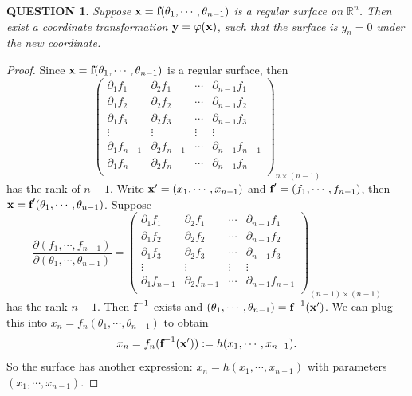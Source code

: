 \documentclass[12pt]{article}
\renewcommand{\(}{\left(}%
\renewcommand{\)}{\right)}%
\renewcommand{\[}{\left[}%
\renewcommand{\]}{\right]}%
\renewcommand{\r}{\mathbb{R}}
\newcommand{\pa}{\partial}
\newtheorem{question}{QUESTION}[section]}
\newtheorem{proof}{Proof.}}
\begin{document}
  \begin{question}
   Suppose $\text{\rmfamily \bfseries x}=\text{\rmfamily \bfseries f}(\theta_1,\cdots,\theta_{n-1} )$ is a regular surface on $\r^n$. Then  exist a coordinate transformation $\text{\rmfamily \bfseries y}=\varphi(\text{\rmfamily \bfseries x})$, such that the surface is $y_n=0$ under the new coordinate.
  \end{question}
  \begin{proof}
   Since $\text{\rmfamily \bfseries x}=\text{\rmfamily \bfseries f}(\theta_1,\cdots,\theta_{n-1} )$ is a regular surface, then
   \begin{equation*}
    \begin{pmatrix}
     \partial_1 f_1 & \partial_2 f_1 & \cdots & \partial_{n-1} f_1\\
     \partial_1 f_2 & \partial_2 f_2 & \cdots & \partial_{n-1} f_2\\
     \partial_1 f_3 & \partial_2 f_3 & \cdots & \partial_{n-1} f_3\\
     \vdots & \vdots & \vdots & \vdots\\
     \partial_1 f_{n-1} & \partial_2 f_{n-1} & \cdots & \partial_{n-1} f_{n-1}\\
     \partial_1 f_n & \partial_2 f_n & \cdots & \partial_{n-1} f_n\\
    \end{pmatrix}_{n\times (n-1)}
   \end{equation*}
   has the rank of $n-1$. Write $\text{\rmfamily \bfseries x}'=(x_1,\cdots,x_{n-1} )$ and $\text{\rmfamily \bfseries f}'=(f_1,\cdots,f_{n-1} )$, then $\text{\rmfamily \bfseries x}=\text{\rmfamily \bfseries f}'(\theta_1,\cdots,\theta_{n-1})$.
   Suppose
   \begin{equation*}
    \frac{\pa(f_1,\cdots,f_{n-1} )}{\partial( \theta_1,\cdots,\theta_{n-1}) } =\begin{pmatrix}
     \partial_1 f_1 & \partial_2 f_1 & \cdots & \partial_{n-1} f_1\\
     \partial_1 f_2 & \partial_2 f_2 & \cdots & \partial_{n-1} f_2\\
     \partial_1 f_3 & \partial_2 f_3 & \cdots & \partial_{n-1} f_3\\
     \vdots & \vdots & \vdots & \vdots\\
     \partial_1 f_{n-1} & \partial_2 f_{n-1} & \cdots & \partial_{n-1} f_{n-1}\\
    \end{pmatrix}_{(n-1)\times (n-1)}
   \end{equation*}
   has the rank $n-1$.  Then $\text{\rmfamily \bfseries f}^{-1}$ exists and $(\theta_1,\cdots,\theta_{n-1} )=\text{\rmfamily \bfseries f}^{-1}(\text{\rmfamily \bfseries x}' )$. We can plug this into $x_n=f_n(\theta_1,\cdots,\theta_{n-1} )$ to obtain
   \begin{equation*}
    x_n=f_n(\text{\rmfamily \bfseries f}^{-1}(\text{\rmfamily \bfseries x}' ) ):=h(x_1,\cdots,x_{n-1} ).
   \end{equation*}
   So the surface has another expression: $x_n=h(x_1,\cdots,x_{n-1})$ with parameters $(x_1,\cdots,x_{n-1} )$.


\end{proof}
\end{document}
